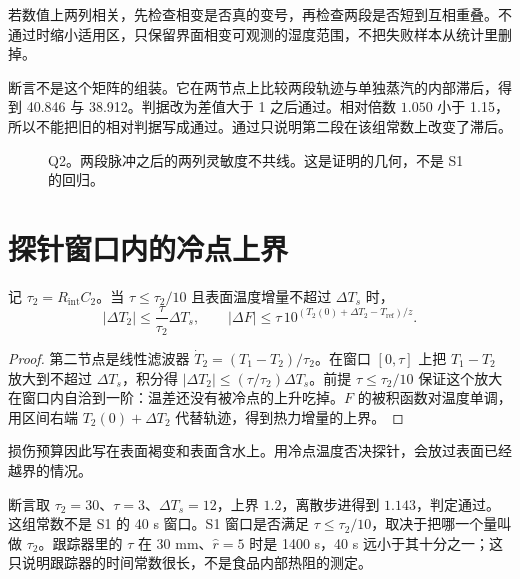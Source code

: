 若数值上两列相关，先检查相变是否真的变号，再检查两段是否短到互相重叠。不通过时缩小适用区，只保留界面相变可观测的湿度范围，不把失败样本从统计里删掉。

断言不是这个矩阵的组装。它在两节点上比较两段轨迹与单独蒸汽的内部滞后，得到 40.846 与 38.912。判据改为差值大于 1 之后通过。相对倍数 \(1.050\) 小于 1.15，所以不能把旧的相对判据写成通过。通过只说明第二段在该组常数上改变了滞后。

\begin{figure}[ht]
\centering
{}
\caption{Q2。两段脉冲之后的两列灵敏度不共线。这是证明的几何，不是 S1 的回归。}
\end{figure}

\section{探针窗口内的冷点上界}

\begin{proposition}[冷点增量]
\label{prop:budget}
记 \(\tau_2=R_{\mathrm{int}}C_2\)。当 \(\tau\le\tau_2/10\) 且表面温度增量不超过 \(\Delta T_s\) 时，
\begin{equation}
|\Delta T_2|\le\frac{\tau}{\tau_2}\Delta T_s,
\qquad
|\Delta F|\le\tau\,10^{(T_2(0)+\Delta T_2-T_{\mathrm{ref}})/z}.
\end{equation}
\end{proposition}

\begin{proof}
第二节点是线性滤波器 \(\dot T_2=(T_1-T_2)/\tau_2\)。在窗口 \([0,\tau]\) 上把 \(T_1-T_2\) 放大到不超过 \(\Delta T_s\)，积分得 \(|\Delta T_2|\le (\tau/\tau_2)\Delta T_s\)。前提 \(\tau\le\tau_2/10\) 保证这个放大在窗口内自洽到一阶：温差还没有被冷点的上升吃掉。\(F\) 的被积函数对温度单调，用区间右端 \(T_2(0)+\Delta T_2\) 代替轨迹，得到热力增量的上界。
\end{proof}

损伤预算因此写在表面褐变和表面含水上。用冷点温度否决探针，会放过表面已经越界的情况。

断言取 \(\tau_2=30\)、\(\tau=3\)、\(\Delta T_s=12\)，上界 \(1.2\)，离散步进得到 \(1.143\)，判定通过。这组常数不是 S1 的 40 s 窗口。S1 窗口是否满足 \(\tau\le\tau_2/10\)，取决于把哪一个量叫做 \(\tau_2\)。跟踪器里的 \(\tau\) 在 30 mm、\(\hat r=5\) 时是 1400 s，40 s 远小于其十分之一；这只说明跟踪器的时间常数很长，不是食品内部热阻的测定。

